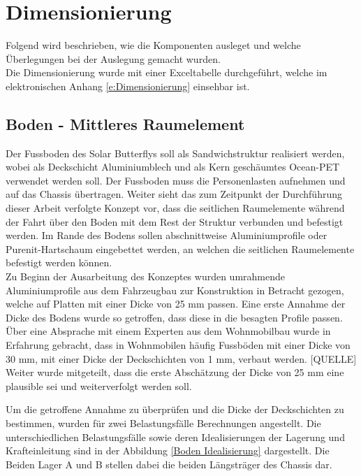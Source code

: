 \section{Dimensionierung}
Folgend wird beschrieben, wie die Komponenten ausleget und welche Überlegungen bei der Auslegung gemacht wurden.\\
Die Dimensionierung wurde mit einer Exceltabelle durchgeführt, welche im elektronischen Anhang \ref{e:Dimensionierung} einsehbar ist.

\subsection{Boden - Mittleres Raumelement}
\label{Boden}
Der Fussboden des Solar Butterflys soll als Sandwichstruktur realisiert werden, wobei als Deckschicht Aluminiumblech und als Kern geschäumtes Ocean-PET verwendet werden soll. Der Fussboden muss die Personenlasten aufnehmen und auf das Chassis übertragen. Weiter sieht das zum Zeitpunkt der Durchführung dieser Arbeit verfolgte Konzept vor, dass die seitlichen Raumelemente während der Fahrt über den Boden mit dem Rest der Struktur verbunden und befestigt werden. Im Rande des Bodens sollen abschnittweise Aluminiumprofile oder Purenit-Hartschaum eingebettet werden, an welchen die seitlichen Raumelemente befestigt werden können.\\
Zu Beginn der Ausarbeitung des Konzeptes wurden umrahmende Aluminiumprofile aus dem Fahrzeugbau zur Konstruktion in Betracht gezogen, welche auf Platten mit einer Dicke von 25 mm passen. Eine erste Annahme der Dicke des Bodens wurde so getroffen, dass diese in die besagten Profile passen. Über eine Absprache mit einem Experten aus dem Wohnmobilbau wurde in Erfahrung gebracht, dass in Wohnmobilen häufig Fussböden mit einer Dicke von 30 mm, mit einer Dicke der Deckschichten von 1 mm, verbaut werden. [QUELLE] Weiter wurde mitgeteilt, dass die erste Abschätzung der Dicke von 25 mm eine plausible sei und weiterverfolgt werden soll.

Um die getroffene Annahme zu überprüfen und die Dicke der Deckschichten zu bestimmen, wurden für zwei Belastungsfälle Berechnungen angestellt. Die unterschiedlichen Belastungsfälle sowie deren Idealisierungen der Lagerung und Krafteinleitung sind in der Abbildung \ref{Boden Idealisierung} dargestellt. Die Beiden Lager A und B stellen dabei die beiden Längsträger des Chassis dar.


